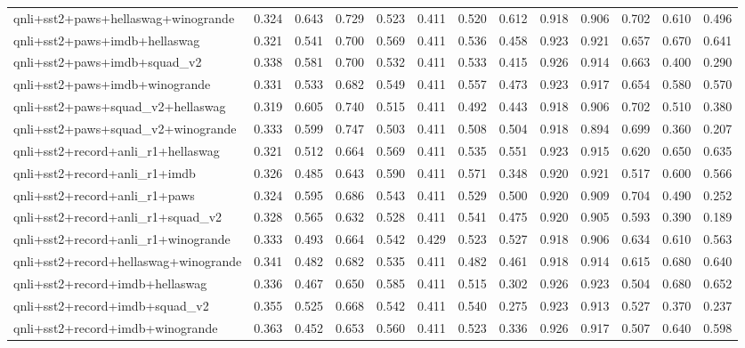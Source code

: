 \begin{table}[t]
\begin{tabular}{lrrrrrrrrrrrr}
    qnli+sst2+paws+hellaswag+winogrande & 0.324 & 0.643 & 0.729 & 0.523 & 0.411 & 0.520 & 0.612 & 0.918 & 0.906 & 0.702 & 0.610 & 0.496 \\
    qnli+sst2+paws+imdb+hellaswag & 0.321 & 0.541 & 0.700 & 0.569 & 0.411 & 0.536 & 0.458 & 0.923 & 0.921 & 0.657 & 0.670 & 0.641 \\
    qnli+sst2+paws+imdb+squad\_v2 & 0.338 & 0.581 & 0.700 & 0.532 & 0.411 & 0.533 & 0.415 & 0.926 & 0.914 & 0.663 & 0.400 & 0.290 \\
    qnli+sst2+paws+imdb+winogrande & 0.331 & 0.533 & 0.682 & 0.549 & 0.411 & 0.557 & 0.473 & 0.923 & 0.917 & 0.654 & 0.580 & 0.570 \\
    qnli+sst2+paws+squad\_v2+hellaswag & 0.319 & 0.605 & 0.740 & 0.515 & 0.411 & 0.492 & 0.443 & 0.918 & 0.906 & 0.702 & 0.510 & 0.380 \\
    qnli+sst2+paws+squad\_v2+winogrande & 0.333 & 0.599 & 0.747 & 0.503 & 0.411 & 0.508 & 0.504 & 0.918 & 0.894 & 0.699 & 0.360 & 0.207 \\
    qnli+sst2+record+anli\_r1+hellaswag & 0.321 & 0.512 & 0.664 & 0.569 & 0.411 & 0.535 & 0.551 & 0.923 & 0.915 & 0.620 & 0.650 & 0.635 \\
    qnli+sst2+record+anli\_r1+imdb & 0.326 & 0.485 & 0.643 & 0.590 & 0.411 & 0.571 & 0.348 & 0.920 & 0.921 & 0.517 & 0.600 & 0.566 \\
    qnli+sst2+record+anli\_r1+paws & 0.324 & 0.595 & 0.686 & 0.543 & 0.411 & 0.529 & 0.500 & 0.920 & 0.909 & 0.704 & 0.490 & 0.252 \\
    qnli+sst2+record+anli\_r1+squad\_v2 & 0.328 & 0.565 & 0.632 & 0.528 & 0.411 & 0.541 & 0.475 & 0.920 & 0.905 & 0.593 & 0.390 & 0.189 \\
    qnli+sst2+record+anli\_r1+winogrande & 0.333 & 0.493 & 0.664 & 0.542 & 0.429 & 0.523 & 0.527 & 0.918 & 0.906 & 0.634 & 0.610 & 0.563 \\
    qnli+sst2+record+hellaswag+winogrande & 0.341 & 0.482 & 0.682 & 0.535 & 0.411 & 0.482 & 0.461 & 0.918 & 0.914 & 0.615 & 0.680 & 0.640 \\
    qnli+sst2+record+imdb+hellaswag & 0.336 & 0.467 & 0.650 & 0.585 & 0.411 & 0.515 & 0.302 & 0.926 & 0.923 & 0.504 & 0.680 & 0.652 \\
    qnli+sst2+record+imdb+squad\_v2 & 0.355 & 0.525 & 0.668 & 0.542 & 0.411 & 0.540 & 0.275 & 0.923 & 0.913 & 0.527 & 0.370 & 0.237 \\
    qnli+sst2+record+imdb+winogrande & 0.363 & 0.452 & 0.653 & 0.560 & 0.411 & 0.523 & 0.336 & 0.926 & 0.917 & 0.507 & 0.640 & 0.598 \\

\end{tabular}
\end{table}
